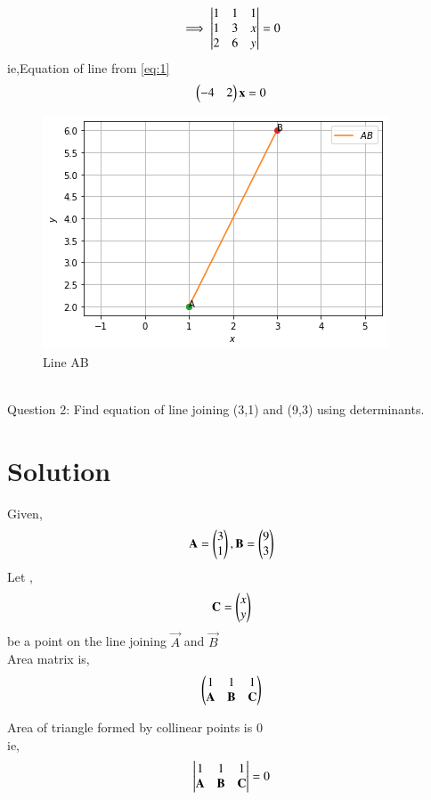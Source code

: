 \documentclass[journal,12pt,twocolumn]{IEEEtran}
\begin{document}
	
\begin{align}
\implies\begin{vmatrix}
	 1 & 1 & 1 \\ 
	 1 & 3 & x \\ 
	 2 & 6 & y\end{vmatrix}=0 \label{eq:1}
\end{align}
ie,Equation of line from \eqref{eq:1}
\begin{align}
	    \begin{pmatrix}-4 & 2\end{pmatrix}\mathbf{x}=0
\end{align}
\begin{figure}[!h]
\centering
\includegraphics[width=\columnwidth]{fig5.png}
\caption{Line AB}
\end{figure}
\\
Question 2:
Find equation of line joining (3,1) and
(9,3) using determinants.
\section{Solution}
Given, 
	\begin{align}
	 \mathbf{A} = \begin{pmatrix}3\\1\end{pmatrix} , \mathbf{B} = \begin{pmatrix}9 \\ 3\end{pmatrix}
	\end{align}
	Let ,
	\begin{align}
	\mathbf{C} = \begin{pmatrix}x\\y\end{pmatrix}
	\end{align}
	be a point on the line joining $\vec{A}$ and $\vec{B}$\\
	Area matrix is,
	\begin{align}
	 \begin{pmatrix}1 & 1& 1 \\
	 \mathbf{A}&\mathbf{B}&\mathbf{C}\end{pmatrix}
	\end{align}

	Area of triangle formed by collinear points is 0\\
	ie,
	\begin{align}
	 \begin{vmatrix}1 & 1& 1 \\
	 \mathbf{A}&\mathbf{B}&\mathbf{C}\end{vmatrix}=0
	\end{align}
\end{document}
